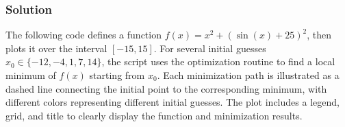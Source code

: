 \documentclass[letterpaper,10pt,english]{jupyterBook}
\begin{document}
\subsubsection{Solution}
\label{\detokenize{01:id14}}
\sphinxAtStartPar
The following code defines a function \(f(x) = x^2 + (\sin(x) + 25)^2\), then plots it over the interval \([-15, 15]\). For several initial guesses \(x_0 \in \{-12, -4, 1, 7, 14\}\), the script uses the  optimization routine  to find a local minimum of \(f(x)\) starting from \(x_0\). Each minimization path is illustrated as a dashed line connecting the initial point to the corresponding minimum, with different colors representing different initial guesses. The plot includes a legend, grid, and title to clearly display the function and minimization results.
\end{document}
